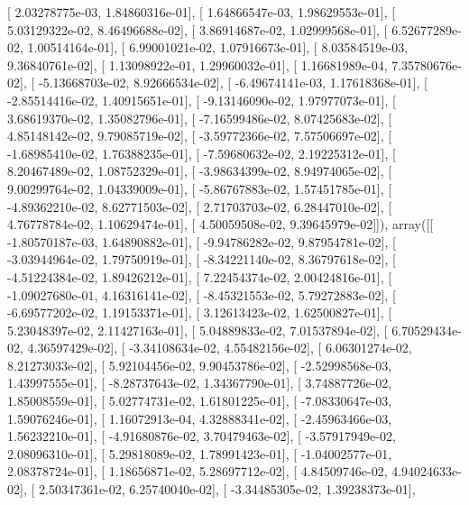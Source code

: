 \documentclass{article}
\begin{document}
       [  2.03278775e-03,   1.84860316e-01],
       [  1.64866547e-03,   1.98629553e-01],
       [  5.03129322e-02,   8.46496688e-02],
       [  3.86914687e-02,   1.02999568e-01],
       [  6.52677289e-02,   1.00514164e-01],
       [  6.99001021e-02,   1.07916673e-01],
       [  8.03584519e-03,   9.36840761e-02],
       [  1.13098922e-01,   1.29960032e-01],
       [  1.16681989e-04,   7.35780676e-02],
       [ -5.13668703e-02,   8.92666534e-02],
       [ -6.49674141e-03,   1.17618368e-01],
       [ -2.85514416e-02,   1.40915651e-01],
       [ -9.13146090e-02,   1.97977073e-01],
       [  3.68619370e-02,   1.35082796e-01],
       [ -7.16599486e-02,   8.07425683e-02],
       [  4.85148142e-02,   9.79085719e-02],
       [ -3.59772366e-02,   7.57506697e-02],
       [ -1.68985410e-02,   1.76388235e-01],
       [ -7.59680632e-02,   2.19225312e-01],
       [  8.20467489e-02,   1.08752329e-01],
       [ -3.98634399e-02,   8.94974065e-02],
       [  9.00299764e-02,   1.04339009e-01],
       [ -5.86767883e-02,   1.57451785e-01],
       [ -4.89362210e-02,   8.62771503e-02],
       [  2.71703703e-02,   6.28447010e-02],
       [  4.76778784e-02,   1.10629474e-01],
       [  4.50059508e-02,   9.39645979e-02]]), array([[ -1.80570187e-03,   1.64890882e-01],
       [ -9.94786282e-02,   9.87954781e-02],
       [ -3.03944964e-02,   1.79750919e-01],
       [ -8.34221140e-02,   8.36797618e-02],
       [ -4.51224384e-02,   1.89426212e-01],
       [  7.22454374e-02,   2.00424816e-01],
       [ -1.09027680e-01,   4.16316141e-02],
       [ -8.45321553e-02,   5.79272883e-02],
       [ -6.69577202e-02,   1.19153371e-01],
       [  3.12613423e-02,   1.62500827e-01],
       [  5.23048397e-02,   2.11427163e-01],
       [  5.04889833e-02,   7.01537894e-02],
       [  6.70529434e-02,   4.36597429e-02],
       [ -3.34108634e-02,   4.55482156e-02],
       [  6.06301274e-02,   8.21273033e-02],
       [  5.92104456e-02,   9.90453786e-02],
       [ -2.52998568e-03,   1.43997555e-01],
       [ -8.28737643e-02,   1.34367790e-01],
       [  3.74887726e-02,   1.85008559e-01],
       [  5.02774731e-02,   1.61801225e-01],
       [ -7.08330647e-03,   1.59076246e-01],
       [  1.16072913e-04,   4.32888341e-02],
       [ -2.45963466e-03,   1.56232210e-01],
       [ -4.91680876e-02,   3.70479463e-02],
       [ -3.57917949e-02,   2.08096310e-01],
       [  5.29818089e-02,   1.78991423e-01],
       [ -1.04002577e-01,   2.08378724e-01],
       [  1.18656871e-02,   5.28697712e-02],
       [  4.84509746e-02,   4.94024633e-02],
       [  2.50347361e-02,   6.25740040e-02],
       [ -3.34485305e-02,   1.39238373e-01],
\end{document}

